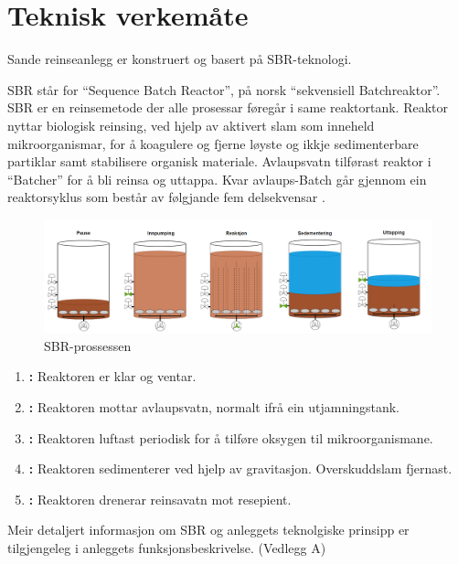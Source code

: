 \newpage
\section{Teknisk verkemåte}
\thispagestyle{fancy}
Sande reinseanlegg er konstruert og basert på \gls{SBR}-teknologi.

\gls{SBR} står for ``Sequence \Gls{Batch} Reactor'', på norsk ``sekvensiell \gls{Batch}reaktor''.\newline
\gls{SBR} er en reinsemetode der alle prosessar føregår i same reaktortank. 
Reaktor nyttar biologisk reinsing, ved hjelp av aktivert slam som inneheld mikroorganismar, for å koagulere 
og fjerne løyste og ikkje sedimenterbare partiklar samt stabilisere organisk materiale. 
Avlaupsvatn tilførast reaktor i ``\gls{Batch}er'' for å bli reinsa og uttappa. 
Kvar avlaups-\gls{Batch} går gjennom ein reaktorsyklus som består av følgjande fem delsekvensar \citep{Statsforvalter}.
\newline

\begin{figure}[htbp]
    \centering
    \includegraphics[width=1\textwidth]{Figurar/SBR-V2.png}
    \caption{\gls{SBR}-prossessen}\label{fig:SBR-Prosessen}
\end{figure}


\begin{enumerate}
    \item \textbf{:} Reaktoren er klar og ventar.
    \item \textbf{:} Reaktoren mottar avlaupsvatn, normalt ifrå ein utjamningstank.
    \item \textbf{:} Reaktoren luftast periodisk for å tilføre oksygen til mikroorganismane.
    \item \textbf{:} Reaktoren sedimenterer ved hjelp av gravitasjon. Overskuddslam fjernast.
    \item \textbf{:} Reaktoren drenerar reinsavatn mot resepient.
\end{enumerate}

Meir detaljert informasjon om \gls{SBR} og anleggets teknolgiske prinsipp er tilgjengeleg i anleggets
funksjonsbeskrivelse. (Vedlegg A)


